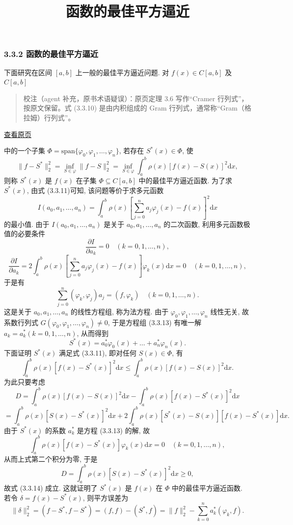 \documentclass[
  10pt,
  fontset=fandol]{ctexart}
\title{函数的最佳平方逼近}
\author{}
\date{}
\begin{document}
\maketitle

\subsubsection{3.3.2 函数的最佳平方逼近}\label{ux51fdux6570ux7684ux6700ux4f73ux5e73ux65b9ux903cux8fd1}

下面研究在区间 \([a,b]\) 上一般的最佳平方逼近问题. 对 \(f(x) \in C[a,b]\) 及 \(C[a,b]\)

\begin{quote}
校注（agent 补充，原书术语疑误）：原页定理 3.6 写作``Cramer 行列式''，按原文保留。式 (3.3.10) 是由内积组成的 Gram 行列式，通常称``Gram（格拉姆）行列式''。
\end{quote}

\href{../../source-images/pdf-068.jpeg}{查看原页}

中的一个子集 \(\Phi = \text{span}\{\varphi_0, \varphi_1, \dots, \varphi_n\}\), 若存在 \(S^*(x) \in \Phi\), 使 \[
\| f - S^* \|_2^2 = \inf_{S \in \varphi} \| f - S \|_2^2 = \inf_{S \in \varphi} \int_a^b \rho(x) [f(x) - S(x)]^2 \mathrm{d}x, \tag{3.3.11}
\] 则称 \(S^*(x)\) 是 \(f(x)\) 在子集 \(\Phi \subseteq C[a, b]\) 中的最佳平方逼近函数. 为了求 \(S^*(x)\), 由式 (3.3.11)可知, 该问题等价于求多元函数 \[
I(a_0, a_1, \dots, a_n) = \int_a^b \rho(x) \left[ \sum_{j=0}^n a_j \varphi_j(x) - f(x) \right]^2 \mathrm{d}x \tag{3.3.12}
\] 的最小值. 由于 \(I(a_0, a_1, \dots, a_n)\) 是关于 \(a_0, a_1, \dots, a_n\) 的二次函数, 利用多元函数极值的必要条件 \[
\frac{\partial I}{\partial a_k} = 0 \quad (k = 0, 1, \dots, n),
\] \[
\frac{\partial I}{\partial a_k} = 2 \int_a^b \rho(x) \left[ \sum_{j=0}^n a_j \varphi_j(x) - f(x) \right] \varphi_k(x) \mathrm{d}x = 0 \quad (k = 0, 1, \dots, n),
\] 于是有 \[
\sum_{j=0}^n (\varphi_k, \varphi_j) a_j = (f, \varphi_k) \quad (k = 0, 1, \dots, n). \tag{3.3.13}
\] 这是关于 \(a_0, a_1, \dots, a_n\) 的线性方程组, 称为法方程. 由于 \(\varphi_0, \varphi_1, \dots, \varphi_n\) 线性无关, 故系数行列式 \(G(\varphi_0, \varphi_1, \dots, \varphi_n) \neq 0\), 于是方程组 (3.3.13) 有唯一解 \(a_k = a_k^* (k = 0, 1, \dots, n)\), 从而得到 \[
S^*(x) = a_0^* \varphi_0(x) + \dots + a_n^* \varphi_n(x).
\] 下面证明 \(S^*(x)\) 满足式 (3.3.11), 即对任何 \(S(x) \in \Phi\), 有 \[
\int_a^b \rho(x) [f(x) - S^*(x)]^2 \mathrm{d}x \leqslant \int_a^b \rho(x) [f(x) - S(x)]^2 \mathrm{d}x. \tag{3.3.14}
\] 为此只要考虑 \[
D = \int_a^b \rho(x) [f(x) - S(x)]^2 \mathrm{d}x - \int_a^b \rho(x) [f(x) - S^*(x)]^2 \mathrm{d}x
\] \[
= \int_a^b \rho(x) [S(x) - S^*(x)]^2 \mathrm{d}x + 2 \int_a^b \rho(x) [S^*(x) - S(x)] [f(x) - S^*(x)] \mathrm{d}x.
\] 由于 \(S^*(x)\) 的系数 \(a_k^*\) 是方程 (3.3.13) 的解, 故 \[
\int_a^b \rho(x) [f(x) - S^*(x)] \varphi_k(x) \mathrm{d}x = 0 \quad (k = 0, 1, \dots, n),
\] 从而上式第二个积分为零, 于是 \[
D = \int_a^b \rho(x) [S(x) - S^*(x)]^2 \mathrm{d}x \geqslant 0,
\] 故式 (3.3.14) 成立. 这就证明了 \(S^*(x)\) 是 \(f(x)\) 在 \(\Phi\) 中的最佳平方逼近函数. 若令 \(\delta = f(x) - S^*(x)\), 则平方误差为 \[
\|\delta\|_2^2 = (f - S^*, f - S^*) = (f, f) - (S^*, f) = \|f\|_2^2 - \sum_{k=0}^n a_k^* (\varphi_k, f). \tag{3.3.15}
\]
\end{document}
